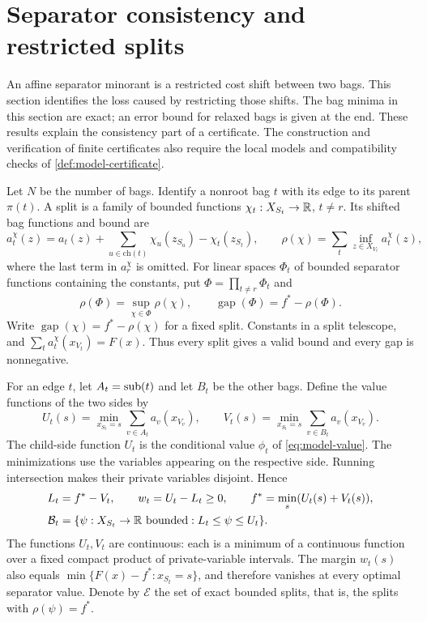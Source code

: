 \section{Separator consistency and restricted splits}
\label{sec:consistency}

An affine separator minorant is a restricted cost shift between two bags.
This section identifies the loss caused by restricting those shifts.  The
bag minima in this section are exact; an error bound for relaxed bags is
given at the end.  These results explain the consistency part of a
certificate.  The construction and verification of finite certificates
also require the local models and compatibility checks of
\cref{def:model-certificate}.

\begin{definition}
\label{def:consistency-split}
Let $N$ be the number of bags.  Identify a nonroot bag $t$ with its edge
to its parent $\pi(t)$.  A split is a family of bounded functions
$\chi_t:X_{S_t}\to\mathbb R$, $t\ne r$.  Its shifted bag functions and bound are
\begin{equation}
\label{eq:consistency-split}
 a_t^\chi(z)=a_t(z)+\sum_{u\in\mathrm{ch}(t)}\chi_u(z_{S_u})
                  -\chi_t(z_{S_t}),
 \qquad
 \rho(\chi)=\sum_t\inf_{z\in X_{V_t}}a_t^\chi(z),
\end{equation}
where the last term in $a_r^\chi$ is omitted.
For linear spaces $\Phi_t$ of bounded separator functions containing the
constants, put $\Phi=\prod_{t\ne r}\Phi_t$ and
\[
 \rho(\Phi)=\sup_{\chi\in\Phi}\rho(\chi),\qquad
 \operatorname{gap}(\Phi)=f^*-\rho(\Phi).
\]
Write $\operatorname{gap}(\chi)=f^*-\rho(\chi)$ for a fixed split.
Constants in a split telescope, and $\sum_ta_t^\chi(x_{V_t})=F(x)$.
Thus every split gives a valid bound and every gap is nonnegative.
\end{definition}

For an edge $t$, let $A_t=\operatorname{sub}(t)$ and let $B_t$ be the other bags.
Define the value functions of the two sides by
\[
 U_t(s)=\min_{x_{S_t}=s}\sum_{v\in A_t}a_v(x_{V_v}),\qquad
 V_t(s)=\min_{x_{S_t}=s}\sum_{v\in B_t}a_v(x_{V_v}).
\]
The child-side function $U_t$ is the conditional value $\phi_t$ of
\cref{eq:model-value}.  The minimizations use the variables appearing on
the respective side.
Running intersection makes their private variables disjoint.  Hence
\begin{align}
\label{eq:consistency-band}
 L_t&=f^*-V_t,\qquad w_t=U_t-L_t\ge0,\qquad
 f^*=\min_s(U_t(s)+V_t(s)),\nonumber\\
 \mathcal B_t&=\{\psi:X_{S_t}\to\mathbb R\text{ bounded}:L_t\le\psi\le U_t\}.
\end{align}
The functions $U_t,V_t$ are continuous: each is a minimum of a continuous
function over a fixed compact product of private-variable intervals.
The margin $w_t(s)$ also equals
$\min\{F(x)-f^*:x_{S_t}=s\}$, and therefore vanishes at every optimal
separator value.  Denote by $\mathcal E$ the set of exact bounded splits,
that is, the splits with $\rho(\psi)=f^*$.


